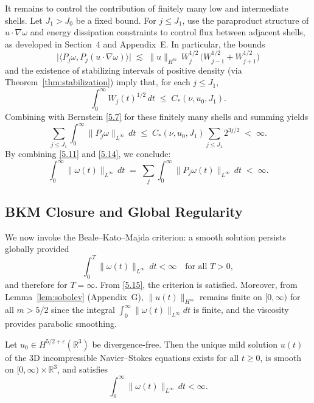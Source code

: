 \documentclass[11pt]{article}
\begin{document}
It remains to control the contribution of finitely many low and intermediate shells. Let $J_1>J_0$ be a fixed bound. For $j \leq J_1$, use the paraproduct structure of $u\cdot \nabla \omega$ and energy dissipation constraints to control flux between adjacent shells, as developed in Section~4 and Appendix~E. In particular, the bounds
\begin{equation}
\big| \langle P_j \omega , P_j(u \cdot \nabla \omega) \rangle \big| \;\lesssim\; \|u\|_{H^m}\, W_j^{1/2}\, \big(W_{j-1}^{1/2} + W_{j+1}^{1/2} \big) \tag{5.12}
\end{equation}
and the existence of stabilizing intervals of positive density (via Theorem~\ref{thm:stabilization}) imply that, for each $j \leq J_1$,
\begin{equation}
\int_0^\infty W_j(t)^{1/2} \, dt \;\le\; C_{\!*}(\nu, u_0, J_1). \tag{5.13}
\end{equation}
Combining with Bernstein \eqref{5.7} for these finitely many shells and summing yields
\begin{equation}
\sum_{j \leq J_1} \int_0^\infty \|P_j \omega\|_{L^\infty} \, dt \;\le\; C_{\!*}(\nu, u_0, J_1) \sum_{j\le J_1} 2^{3j/2} \;<\;\infty. \tag{5.14}
\end{equation}
By combining \eqref{5.11} and \eqref{5.14}, we conclude:
\begin{equation}
\int_0^\infty \|\omega(t)\|_{L^\infty} \, dt 
\;=\; \sum_{j} \int_0^\infty \|P_j \omega(t)\|_{L^\infty} \, dt \;<\; \infty. \tag{5.15}
\end{equation}

\subsection{BKM Closure and Global Regularity}

We now invoke the Beale--Kato--Majda criterion: a smooth solution persists globally provided
\[
\int_0^T \|\omega(t)\|_{L^\infty} \, dt < \infty \quad \text{for all } T>0,
\]
and therefore for $T=\infty$. From \eqref{5.15}, the criterion is satisfied. Moreover, from Lemma~\ref{lem:sobolev} (Appendix~G), $\|u(t)\|_{H^m}$ remains finite on $[0,\infty)$ for all $m>5/2$ since the integral $\int_0^\infty \|\omega(t)\|_{L^\infty} dt$ is finite, and the viscosity provides parabolic smoothing.

\begin{theorem} \label{thm:global-regularity}
Let $u_0 \in H^{5/2+\varepsilon}(\mathbb{R}^3)$ be divergence-free. Then the unique mild solution $u(t)$ of the 3D incompressible Navier--Stokes equations exists for all $t \ge 0$, is smooth on $[0,\infty) \times \mathbb{R}^3$, and satisfies
\[
\int_0^\infty \|\omega(t)\|_{L^\infty} \, dt < \infty.
\]
\end{theorem}
\end{document}
